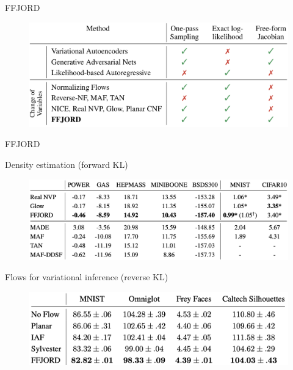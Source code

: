 \begin{frame}{FFJORD}
\begin{minipage}[t]{0.6\columnwidth}
	\end{minipage}
	\begin{figure}
		\centering
		\includegraphics[width=0.8\linewidth]{figs/flow_comparison.png}
	\end{figure}
\end{frame}
\begin{frame}{FFJORD}
	\begin{block}{Density estimation (forward KL)}
		\begin{figure}
			\centering
			\includegraphics[width=0.8\linewidth]{figs/ffjord_results}
		\end{figure}
	\end{block}
	\begin{block}{Flows for variational inference (reverse KL)}
		\begin{figure}
			\centering
			\includegraphics[width=0.8\linewidth]{figs/ffjord_vae}
		\end{figure}
	\end{block}

\end{frame}

